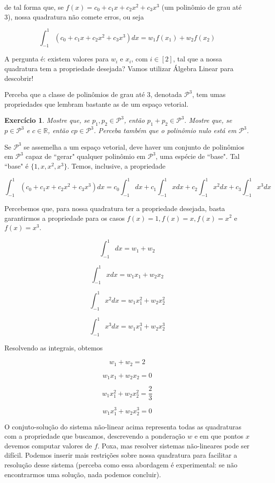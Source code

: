 \documentclass[]{article}
\newtheorem{exercicio}{Exercício}
\numberwithin{equation}{section}
\begin{document}
de tal forma que, se $f(x) = c_0 + c_1x + c_2x^2 + c_3x^3$ (um
polinômio de grau até 3), nossa quadratura não comete erros, ou seja

$$
\int_{-1}^{1} (c_0 + c_1x + c_2x^2 + c_3x^3) dx = w_1 f(x_1) + w_2 f(x_2)
$$

A pergunta é: existem valores para $w_i$ e $x_i$, com $i \in [2]$, tal
que a nossa quadratura tem a propriedade desejada? Vamos utilizar
Álgebra Linear para descobrir!

Perceba que a classe de polinômios de grau até 3, denotada
$\mathcal{P}^3$, tem umas propriedades que lembram bastante as de um
espaço vetorial.

\begin{exercicio}
  Mostre que, se $p_1, p_2 \in \mathcal{P}^3$, então
  $p_1 + p_2 \in \mathcal{P}^3$. Mostre que, se $p \in \mathcal{P}^3$
  e $c \in \mathbb{R}$, então $cp \in \mathcal{P}^3$. Perceba também
  que o polinômio nulo está em $\mathcal{P}^3$.
\end{exercicio}

Se $\mathcal{P}^3$ se assemelha a um espaço vetorial, deve haver um
conjunto de polinômios em $\mathcal{P}^3$ capaz de ``gerar" qualquer
polinômio em $\mathcal{P}^3$, uma espécie de ``base". Tal ``base" é
$\{1, x, x^2, x^3\}$. Temos, inclusive, a propriedade

$$
\int_{-1}^{1} (c_0 + c_1x + c_2x^2 + c_3x^3) dx = c_0\int_{-1}^{1} dx + c_1\int_{-1}^{1} x dx + c_2\int_{-1}^{1} x^2 dx + c_3\int_{-1}^{1} x^3 dx
$$

Percebemos que, para nossa quadratura ter a propriedade desejada,
basta garantirmos a propriedade para os casos
$f(x) = 1, f(x) = x, f(x) = x^2$ e $f(x) = x^3$.

$$
\int_{-1}^{1} dx = w_1 + w_2
$$

$$
\int_{-1}^{1} x dx = w_1 x_1 + w_2 x_2
$$

$$
\int_{-1}^{1} x^2 dx = w_1 x_1^2 + w_2 x_2^2
$$

$$
\int_{-1}^{1} x^3 dx = w_1 x_1^3 + w_2 x_2^3
$$

Resolvendo as integrais, obtemos

$$
w_1 + w_2 = 2
$$

$$
w_1 x_1 + w_2 x_2 = 0
$$

$$
w_1 x_1^2 + w_2 x_2^2 = \frac{2}{3}
$$

$$
w_1 x_1^3 + w_2 x_2^3 = 0
$$

O conjuto-solução do sistema não-linear acima representa todas as
quadraturas com a propriedade que buscamos, descrevendo a ponderação
$w$ e em que pontos $x$ devemos computar valores de $f$. Poxa, mas
resolver sistemas não-lineares pode ser difícil. Podemos inserir mais
restrições sobre nossa quadratura para facilitar a resolução desse
sistema (perceba como essa abordagem é experimental: se não
encontrarmos uma solução, nada podemos concluir).
\end{document}
